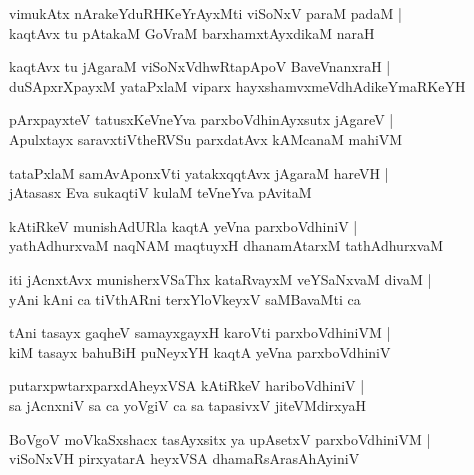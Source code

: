 \documentclass[twoside,12pt,openright]{book}
\newcounter{shloka}[chapter]
\begin{document}
\begin{shloka}%
vimukAtx nArakeYduRHKeYrAyxMti viSoNxV paraM padaM |\\
kaqtAvx tu pAtakaM GoVraM barxhamxtAyxdikaM naraH 
\end{shloka}

\begin{shloka}%
kaqtAvx tu jAgaraM viSoNxVdhwRtapApoV BaveVnanxraH |\\
duSApxrXpayxM yataPxlaM viparx hayxshamvxmeVdhAdikeYmaRKeYH
\end{shloka}

\begin{shloka}%
pArxpayxteV tatusxKeVneYva parxboVdhinAyxsutx jAgareV |\\
Apulxtayx saravxtiVtheRVSu parxdatAvx kAMcanaM mahiVM 
\end{shloka}

\begin{shloka}%
tataPxlaM samAvAponxVti yatakxqqtAvx jAgaraM hareVH |\\
jAtasasx Eva sukaqtiV kulaM teVneYva pAvitaM 
\end{shloka}

\begin{shloka}%
kAtiRkeV munishAdURla kaqtA yeVna parxboVdhiniV |\\
yathAdhurxvaM naqNAM maqtuyxH dhanamAtarxM tathAdhurxvaM 
\end{shloka}

\begin{shloka}%
iti jAcnxtAvx munisherxVSaThx kataRvayxM veYSaNxvaM divaM |\\
yAni kAni ca tiVthARni terxYloVkeyxV saMBavaMti ca 
\end{shloka}

\begin{shloka}%
tAni tasayx gaqheV samayxgayxH karoVti parxboVdhiniVM |\\
kiM tasayx bahuBiH puNeyxYH kaqtA yeVna parxboVdhiniV
\end{shloka}

\begin{shloka}%
putarxpwtarxparxdAheyxVSA kAtiRkeV hariboVdhiniV |\\
sa jAcnxniV sa ca yoVgiV ca sa tapasivxV jiteVMdirxyaH
\end{shloka}

\begin{shloka}%
BoVgoV moVkaSxshacx tasAyxsitx ya upAsetxV parxboVdhiniVM |\\
viSoNxVH pirxyatarA heyxVSA dhamaRsArasAhAyiniV
\end{shloka}
\end{document}
